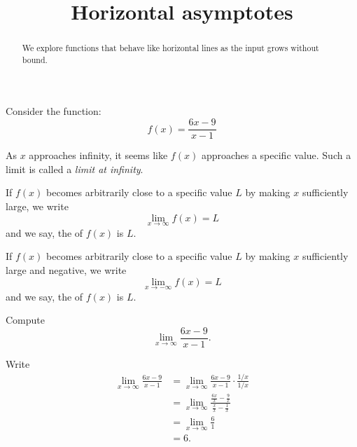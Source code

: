 \documentclass{ximera}
\title[Dig-In:]{Horizontal asymptotes}
\begin{document}
\begin{abstract}
We explore functions that behave like horizontal lines as the input
grows without bound.
\end{abstract}
\maketitle



Consider the function:
\[
f(x) = \frac{6x-9}{x-1}
\]
\begin{image}
\end{image}
As $x$ approaches infinity, it seems like $f(x)$ approaches a specific
value. Such a limit is called a \textit{limit at infinity}.

\begin{definition}\label{def:limitAtInfty}
If $f(x)$ becomes arbitrarily close to a specific value $L$ by making
$x$ sufficiently large, we write
\[
\lim_{x\to \infty} f(x) = L
\]
and we say, the  of $f(x)$ is $L$.  

If $f(x)$ becomes arbitrarily close to a specific value $L$ by making
$x$ sufficiently large and negative, we write
\[
\lim_{x\to -\infty} f(x) = L
\]
and we say, the  of $f(x)$ is $L$.  
\end{definition}

\begin{example} Compute
\[
\lim_{x\to\infty} \frac{6x-9}{x-1}.
\]
\begin{explanation}
Write
\begin{align*}
\lim_{x\to\infty}\frac{6x-9}{x-1} &= \lim_{x\to\infty}\frac{6x-9}{x-1}\cdot \frac{1/x}{1/x}\\
&=\lim_{x\to\infty}\frac{\frac{6x}{x} - \frac{9}{x}}{\frac{x}{x} - \frac{1}{x}}\\
&= \lim_{x\to\infty} \frac{6}{1}\\
&= 6.
\end{align*}
\end{explanation}
\end{example}
\end{document}
